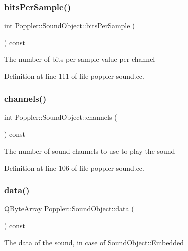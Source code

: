 \subsubsection{\texorpdfstring{bits\+Per\+Sample()}{bitsPerSample()}}
{\footnotesize\ttfamily int Poppler\+::\+Sound\+Object\+::bits\+Per\+Sample (\begin{DoxyParamCaption}{ }\end{DoxyParamCaption}) const}

The number of bits per sample value per channel 

Definition at line 111 of file poppler-\/sound.\+cc.

\mbox{\label{class_poppler_1_1_sound_object_a58739de86624f0c4f0f3a72da77862e4}} 
\subsubsection{\texorpdfstring{channels()}{channels()}}
{\footnotesize\ttfamily int Poppler\+::\+Sound\+Object\+::channels (\begin{DoxyParamCaption}{ }\end{DoxyParamCaption}) const}

The number of sound channels to use to play the sound 

Definition at line 106 of file poppler-\/sound.\+cc.

\mbox{\label{class_poppler_1_1_sound_object_ae314846926ed860809e3651607a52bec}} 
\subsubsection{\texorpdfstring{data()}{data()}}
{\footnotesize\ttfamily Q\+Byte\+Array Poppler\+::\+Sound\+Object\+::data (\begin{DoxyParamCaption}{ }\end{DoxyParamCaption}) const}

The data of the sound, in case of \hyperlink{class_poppler_1_1_sound_object_ac9f524c6c40abcbb1c9e09c29e020c5bab50528f996b2b62c454d83c472ef27c8}{Sound\+Object\+::\+Embedded} 

